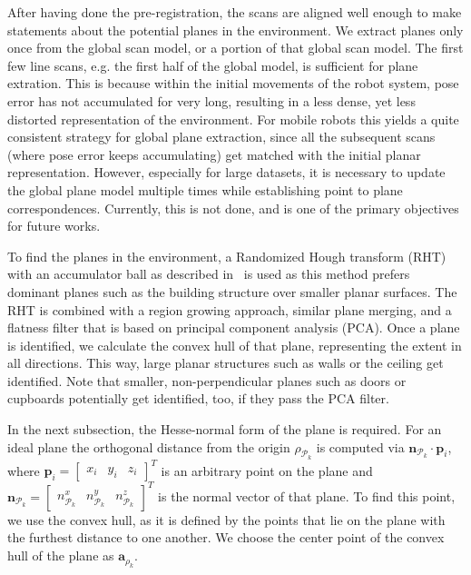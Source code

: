 \documentclass[5p]{elsarticle}
\renewcommand{\vec}[1]{\mathbf{#1}}
\begin{document}
After having done the pre-registration, the scans are aligned well enough to make statements about the potential planes in the environment.
We extract planes only once from the global scan model, or a portion of that global scan model.
The first few line scans, e.g. the first half of the global model, is sufficient for plane extration.
This is because within the initial movements of the robot system, pose error has not accumulated for very long, resulting in a less dense, yet less distorted representation of the environment.
For mobile robots this yields a quite consistent strategy for global plane extraction, since all the subsequent scans (where pose error keeps accumulating) get matched with the initial planar representation.
However, especially for large datasets, it is necessary to update the global plane model multiple times while establishing point to plane correspondences.  
Currently, this is not done, and is one of the primary objectives for future works.

To find the planes in the environment, a Randomized Hough transform (RHT) with an accumulator ball as described in~\cite{3DRESEARCH2011} is used as this method prefers dominant planes such as the building structure over smaller planar surfaces.
The RHT is combined with a region growing approach, similar plane merging, and a flatness filter that is based on principal component analysis (PCA).
Once a plane is identified, we calculate the convex hull of that plane, representing the extent in all directions. 
This way, large planar structures such as walls or the ceiling get identified.
Note that smaller, non-perpendicular planes such as doors or cupboards potentially get identified, too, if they pass the PCA filter.

In the next subsection, the Hesse-normal form of the plane is required.
For an ideal plane the orthogonal distance from the origin $\rho_{\mathcal{P}_k}$ is computed via $\vec{n}_{\mathcal{P}_k}\cdot\vec{p}_i$, where $\vec{p}_i = \begin{bmatrix}x_i&y_i&z_i\end{bmatrix}^T$ is an arbitrary point on the plane and $\vec{n}_{\mathcal{P}_k} = \begin{bmatrix}n_{\mathcal{P}_k}^x&n_{\mathcal{P}_k}^y&n_{\mathcal{P}_k}^z\end{bmatrix}^T$ is the normal vector of that plane.
To find this point, we use the convex hull, as it is defined by the points that lie on the plane with the furthest distance to one another.
We choose the center point of the convex hull of the plane as $\vec{a}_{\rho_k}$.
\end{document}
